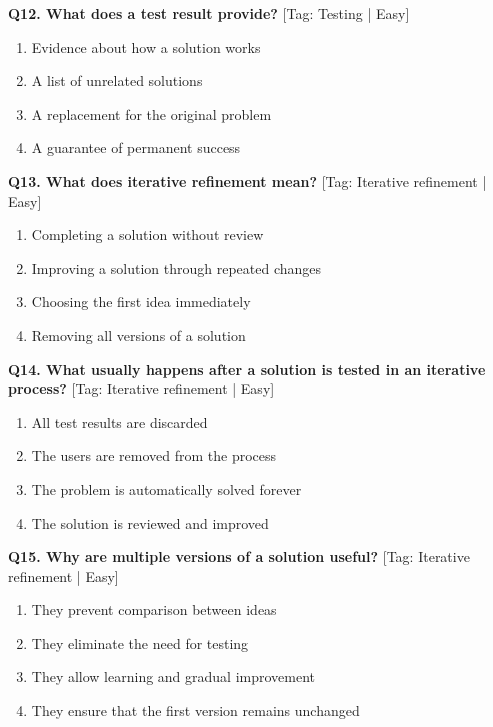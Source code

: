 \noindent\textbf{Q12. What does a test result provide?} \hfill [Tag: Testing | Easy]
\begin{enumerate}[label=(\alph*),topsep=2pt,itemsep=1pt,partopsep=0pt,parsep=0pt]
    \item {Evidence about how a solution works}
    \item {A list of unrelated solutions}
    \item {A replacement for the original problem}
    \item {A guarantee of permanent success}
\end{enumerate}
\vspace{2mm}

\noindent\textbf{Q13. What does iterative refinement mean?} \hfill [Tag: Iterative refinement | Easy]
\begin{enumerate}[label=(\alph*),topsep=2pt,itemsep=1pt,partopsep=0pt,parsep=0pt]
    \item {Completing a solution without review}
    \item {Improving a solution through repeated changes}
    \item {Choosing the first idea immediately}
    \item {Removing all versions of a solution}
\end{enumerate}
\vspace{2mm}

\noindent\textbf{Q14. What usually happens after a solution is tested in an iterative process?} \hfill [Tag: Iterative refinement | Easy]
\begin{enumerate}[label=(\alph*),topsep=2pt,itemsep=1pt,partopsep=0pt,parsep=0pt]
    \item {All test results are discarded}
    \item {The users are removed from the process}
    \item {The problem is automatically solved forever}
    \item {The solution is reviewed and improved}
\end{enumerate}
\vspace{2mm}

\noindent\textbf{Q15. Why are multiple versions of a solution useful?} \hfill [Tag: Iterative refinement | Easy]
\begin{enumerate}[label=(\alph*),topsep=2pt,itemsep=1pt,partopsep=0pt,parsep=0pt]
    \item {They prevent comparison between ideas}
    \item {They eliminate the need for testing}
    \item {They allow learning and gradual improvement}
    \item {They ensure that the first version remains unchanged}
\end{enumerate}
\vspace{2mm}

